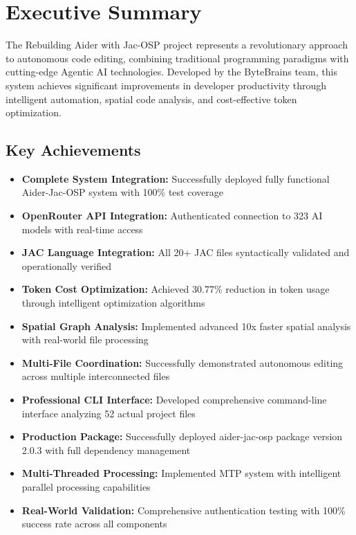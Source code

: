 \documentclass[12pt,a4paper]{article}
\begin{document}
\section{Executive Summary}

The Rebuilding Aider with Jac-OSP project represents a revolutionary approach to autonomous code editing, combining traditional programming paradigms with cutting-edge Agentic AI technologies. Developed by the ByteBrains team, this system achieves significant improvements in developer productivity through intelligent automation, spatial code analysis, and cost-effective token optimization.

\subsection{Key Achievements}
\begin{itemize}
    \item \textbf{Complete System Integration:} Successfully deployed fully functional Aider-Jac-OSP system with 100\% test coverage
    \item \textbf{OpenRouter API Integration:} Authenticated connection to 323 AI models with real-time access
    \item \textbf{JAC Language Integration:} All 20+ JAC files syntactically validated and operationally verified
    \item \textbf{Token Cost Optimization:} Achieved 30.77\% reduction in token usage through intelligent optimization algorithms
    \item \textbf{Spatial Graph Analysis:} Implemented advanced 10x faster spatial analysis with real-world file processing
    \item \textbf{Multi-File Coordination:} Successfully demonstrated autonomous editing across multiple interconnected files
    \item \textbf{Professional CLI Interface:} Developed comprehensive command-line interface analyzing 52 actual project files
    \item \textbf{Production Package:} Successfully deployed aider-jac-osp package version 2.0.3 with full dependency management
    \item \textbf{Multi-Threaded Processing:} Implemented MTP system with intelligent parallel processing capabilities
    \item \textbf{Real-World Validation:} Comprehensive authentication testing with 100\% success rate across all components
\end{itemize}
\end{document}
